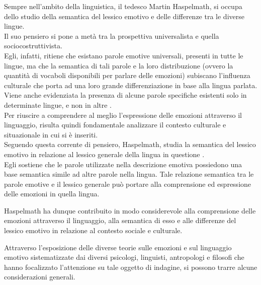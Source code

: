 Sempre nell'ambito della linguistica, il tedesco Martin Haspelmath, si occupa dello studio della semantica del lessico emotivo e delle differenze tra le diverse lingue.\\
Il suo pensiero si pone a metà tra la prospettiva universalista e quella sociocostruttivista.\\
Egli, infatti, ritiene che esistano parole emotive universali, presenti in tutte le lingue, ma che la semantica di tali parole e la loro distribuzione (ovvero la quantità di vocaboli disponibili per parlare delle emozioni) subiscano l'influenza culturale che porta ad una loro grande differenziazione in base alla lingua parlata.\\
Viene anche evidenziata la presenza di alcune parole specifiche esistenti solo in determinate lingue, e non in altre \parencite{haspelmath}.\\
Per riuscire a comprendere al meglio l'espressione delle emozioni attraverso il linguaggio, risulta quindi fondamentale analizzare il contesto culturale e situazionale in cui si è inseriti. \\
Seguendo questa corrente di pensiero, Haspelmath, studia la semantica del lessico emotivo in relazione al lessico generale della lingua in questione \parencite{Haspelmath_articolo}.\\
Egli sostiene che le parole utilizzate nella descrizione emotiva possiedono una base semantica simile ad altre parole nella lingua. Tale relazione semantica tra le parole emotive e il lessico generale può portare alla comprensione ed espressione delle emozioni in quella lingua. 

Haspelmath ha dunque contribuito in modo considerevole alla comprensione delle emozioni attraverso il linguaggio, alla semantica di esso e alle differenze del lessico emotivo in relazione al contesto sociale e culturale. 

Attraverso l’esposizione delle diverse teorie sulle emozioni e sul linguaggio emotivo sistematizzate dai diversi psicologi, linguisti, antropologi e filosofi che hanno focalizzato l’attenzione su tale oggetto di indagine, si possono trarre alcune considerazioni generali. 

